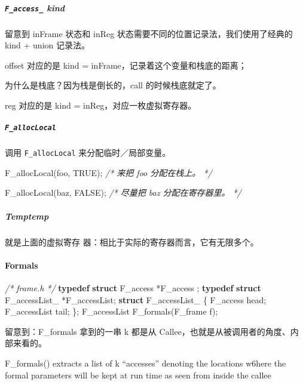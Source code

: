 \documentclass[
]{article}
\newenvironment{Shaded}{}{}
\newcommand{\CommentTok}[1]{\textcolor[rgb]{0.38,0.63,0.69}{\textit{#1}}}
\newcommand{\KeywordTok}[1]{\textcolor[rgb]{0.00,0.44,0.13}{\textbf{#1}}}
\newcommand{\NormalTok}[1]{#1}
\begin{document}
\hypertarget{header-n57}{%
\subparagraph{\texorpdfstring{\texttt{F\_access\_}
kind}{F\_access\_ kind}}\label{header-n57}}

留意到 inFrame 状态和 inReg 状态需要不同的位置记录法，我们使用了经典的
kind + union 记录法。

offset 对应的是 kind = inFrame，记录着这个变量和栈底的距离；

为什么是栈底？因为栈是倒长的，call 的时候栈底就定了。

reg 对应的是 kind = inReg，对应一枚虚拟寄存器。

\hypertarget{header-n62}{%
\subparagraph{\texorpdfstring{\texttt{F\_allocLocal}}{F\_allocLocal}}\label{header-n62}}

调用 \texttt{F\_allocLocal} 来分配临时／局部变量。

\begin{Shaded}
\begin{Highlighting}[]
\NormalTok{F_allocLocal(foo, TRUE);}
\CommentTok{/* 来把 foo 分配在栈上。 */}

\NormalTok{F_allocLocal(baz, FALSE);}
\CommentTok{/* 尽量把 baz 分配在寄存器里。 */}
\end{Highlighting}
\end{Shaded}

\hypertarget{header-n65}{%
\subparagraph{\texorpdfstring{Temp\emph{temp}
}{Temptemp }}\label{header-n65}}

就是上面的虚拟寄存 器：相比于实际的寄存器而言，它有无限多个。

\hypertarget{header-n67}{%
\paragraph{Formals}\label{header-n67}}

\begin{Shaded}
\begin{Highlighting}[]
\CommentTok{/* frame.h */}
\KeywordTok{typedef} \KeywordTok{struct}\NormalTok{ F_access *F_access ;}
\KeywordTok{typedef}  \KeywordTok{struct}\NormalTok{ F_accessList_ *F_accessList;}
\KeywordTok{struct}\NormalTok{ F_accessList_ \{ F_access head; F_accessList tail; \};}
\NormalTok{F_accessList F_formals(F_frame f);}
\end{Highlighting}
\end{Shaded}

留意到：F\_formals 拿到的一串 k 都是从
Callee，也就是从被调用者的角度、内部来看的。

F\_formals() extracts a list of k ``accesses'' denoting the locations
w6here the formal parameters will be kept at run time as seen from
inside the callee
\end{document}
